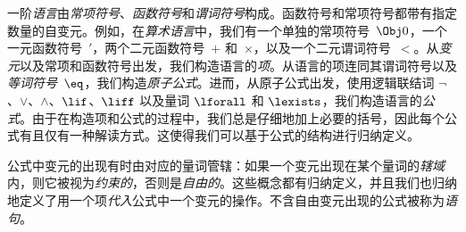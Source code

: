 一阶\emph{语言}由\emph{常项符号}、\emph{函数符号}和\emph{谓词符号}构成。函数符号和常项符号都带有指定数量的自变元。例如，在\emph{算术语言}中，我们有一个单独的常项符号~$\Obj 0$，一个一元函数符号~$\prime$，两个二元函数符号~$+$ 和~$\times$，以及一个二元谓词符号~$<$。从\emph{变元}以及常项和函数符号出发，我们构造语言的\emph{项}。从语言的项连同其谓词符号以及\emph{等词符号}~$\eq$，我们构造\emph{原子公式}。进而，从原子公式出发，使用逻辑联结词 $\lnot$、$\lor$、$\land$、$\lif$、$\liff$ 以及量词 $\lforall$ 和 $\lexists$，我们构造语言的\emph{公式}。由于在构造项和公式的过程中，我们总是仔细地加上必要的括号，因此每个公式有且仅有一种解读方式。这使得我们可以基于公式的结构进行归纳定义。

公式中变元的出现有时由对应的量词管辖：如果一个变元出现在某个量词的\emph{辖域}内，则它被视为\emph{约束的}，否则是\emph{自由的}。这些概念都有归纳定义，并且我们也归纳地定义了用一个项\emph{代入}公式中一个变元的操作。不含自由变元出现的公式被称为\emph{语句}。